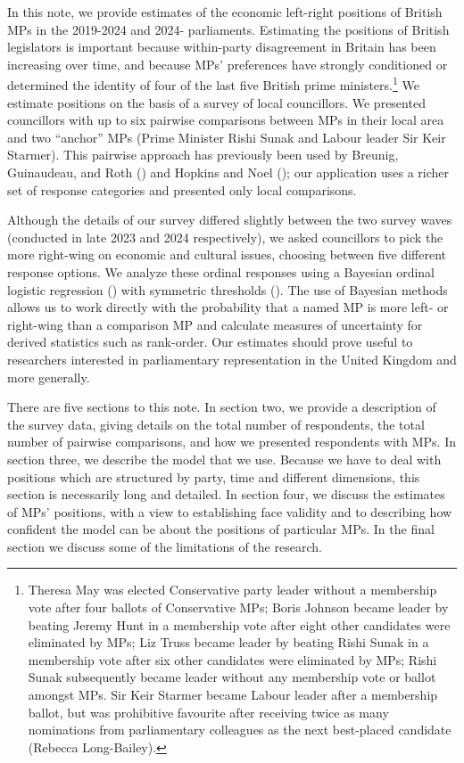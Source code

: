 \documentclass[
]{article}
\begin{document}
In this note, we provide estimates of the economic left-right positions
of British MPs in the 2019-2024 and 2024- parliaments. Estimating the
positions of British legislators is important because within-party
disagreement in Britain has been increasing over time, and because MPs'
preferences have strongly conditioned or determined the identity of four
of the last five British prime ministers.\footnote{Theresa May was
  elected Conservative party leader without a membership vote after four
  ballots of Conservative MPs; Boris Johnson became leader by beating
  Jeremy Hunt in a membership vote after eight other candidates were
  eliminated by MPs; Liz Truss became leader by beating Rishi Sunak in a
  membership vote after six other candidates were eliminated by MPs;
  Rishi Sunak subsequently became leader without any membership vote or
  ballot amongst MPs. Sir Keir Starmer became Labour leader after a
  membership ballot, but was prohibitive favourite after receiving twice
  as many nominations from parliamentary colleagues as the next
  best-placed candidate (Rebecca Long-Bailey).} We estimate positions on
the basis of a survey of local councillors. We presented councillors
with up to six pairwise comparisons between MPs in their local area and
two ``anchor'' MPs (Prime Minister Rishi Sunak and Labour leader Sir
Keir Starmer). This pairwise approach has previously been used by
Breunig, Guinaudeau, and Roth
() and Hopkins and Noel
(); our application uses a richer
set of response categories and presented only local comparisons.

Although the details of our survey differed slightly between the two
survey waves (conducted in late 2023 and 2024 respectively), we asked
councillors to pick the more right-wing on economic and cultural issues,
choosing between five different response options. We analyze these
ordinal responses using a Bayesian ordinal logistic regression
() with
symmetric thresholds (). The
use of Bayesian methods allows us to work directly with the probability
that a named MP is more left- or right-wing than a comparison MP and
calculate measures of uncertainty for derived statistics such as
rank-order. Our estimates should prove useful to researchers interested
in parliamentary representation in the United Kingdom and more
generally.

There are five sections to this note. In section two, we provide a
description of the survey data, giving details on the total number of
respondents, the total number of pairwise comparisons, and how we
presented respondents with MPs. In section three, we describe the model
that we use. Because we have to deal with positions which are structured
by party, time and different dimensions, this section is necessarily
long and detailed. In section four, we discuss the estimates of MPs'
positions, with a view to establishing face validity and to describing
how confident the model can be about the positions of particular MPs. In
the final section we discuss some of the limitations of the research.
\end{document}
